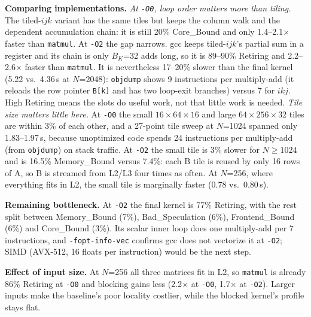\documentclass[10pt]{article}
\begin{document}
\textbf{Comparing implementations.} \emph{At \texttt{-O0}, loop order matters more than tiling.} The tiled-$ijk$ variant has the same tiles but keeps the column walk and the dependent accumulation chain: it is still 20\% Core\_Bound and only 1.4--2.1$\times$ faster than \texttt{matmul}. At \texttt{-O2} the gap narrows. gcc keeps tiled-$ijk$'s partial sum in a register and its chain is only $B_K$=32 adds long, so it is 89--90\% Retiring and 2.2--2.6$\times$ faster than \texttt{matmul}. It is nevertheless 17--20\% slower than the final kernel (5.22 vs.\ 4.36\,s at $N$=2048): \texttt{objdump} shows 9 instructions per multiply-add (it reloads the row pointer \texttt{B[k]} and has two loop-exit branches) versus 7 for $ikj$. High Retiring means the slots do useful work, not that little work is needed. \emph{Tile size matters little here.} At \texttt{-O0} the small $16\times64\times16$ and large $64\times256\times32$ tiles are within 3\% of each other, and a 27-point tile sweep at $N$=1024 spanned only 1.83--1.97\,s, because unoptimized code spends 24 instructions per multiply-add (from \texttt{objdump}) on stack traffic. At \texttt{-O2} the small tile is 3\% slower for $N\geq1024$ and is 16.5\% Memory\_Bound versus 7.4\%: each B tile is reused by only 16 rows of A, so B is streamed from L2/L3 four times as often. At $N$=256, where everything fits in L2, the small tile is marginally faster (0.78 vs.\ 0.80\,s).

\textbf{Remaining bottleneck.} At \texttt{-O2} the final kernel is 77\% Retiring, with the rest split between Memory\_Bound (7\%), Bad\_Speculation (6\%), Frontend\_Bound (6\%) and Core\_Bound (3\%). Its scalar inner loop does one multiply-add per 7 instructions, and \texttt{-fopt-info-vec} confirms gcc does not vectorize it at \texttt{-O2}; SIMD (AVX-512, 16 floats per instruction) would be the next step.

\textbf{Effect of input size.} At $N$=256 all three matrices fit in L2, so \texttt{matmul} is already 86\% Retiring at \texttt{-O0} and blocking gains less (2.2$\times$ at \texttt{-O0}, 1.7$\times$ at \texttt{-O2}). Larger inputs make the baseline's poor locality costlier, while the blocked kernel's profile stays flat.
\end{document}
